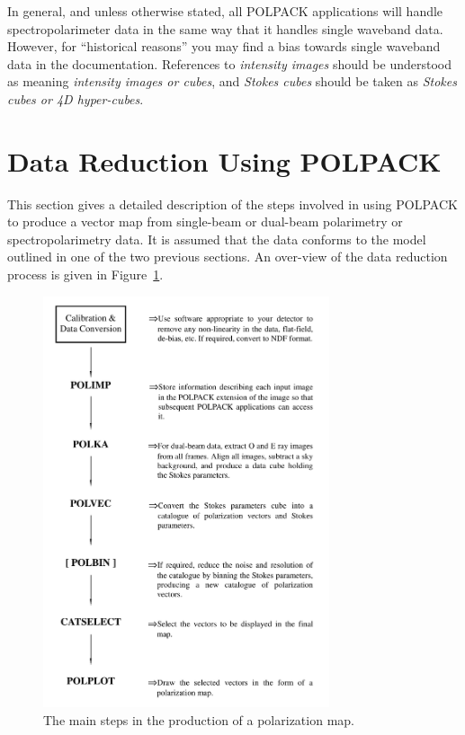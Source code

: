 \documentclass[twoside,11pt]{starlink}
\begin{document}
In general, and unless otherwise stated, all POLPACK applications will handle
spectropolarimeter data in the same way that it handles single waveband
data. However, for ``historical reasons'' you may find a bias towards single
waveband data in the documentation. References to \emph{intensity images}
should be understood as meaning \emph{intensity images or cubes}, and
\emph{Stokes cubes} should be taken as \emph{Stokes cubes or 4D
hyper-cubes}.

\section{\label{SEC:POLRED}Data Reduction Using POLPACK}
This section gives a detailed description of the steps involved in using
POLPACK to produce a vector map from single-beam or dual-beam polarimetry
or spectropolarimetry data. It is assumed that the data conforms to the model outlined in one
of the two previous sections. An over-view of the data reduction process
is given in Figure~\ref{fig:dataflow}.

  \begin{figure}[htpb]
  \begin{center}
  \includegraphics[clip,width=0.75\textwidth]{sun223_figures/dataflow}
  \vspace{4mm}
  \caption{The main steps in the production of a polarization map.}
  \label{fig:dataflow}
  \end{center}
  \end{figure}
\end{document}
